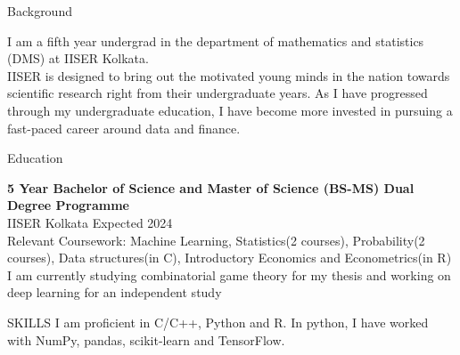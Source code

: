 \documentclass{resume} %
\begin{document}

\begin{rSection}{Background}

I am a fifth year undergrad in the department of mathematics and statistics (DMS) at IISER Kolkata.\\
IISER is designed
to bring out the motivated young minds in the nation towards scientific research right from their undergraduate years.
As I have progressed through my undergraduate education, I have become more invested in pursuing a fast-paced career around data and finance.

\end{rSection}

\begin{rSection}{Education}

{\bf 5 Year Bachelor of Science and Master of Science (BS-MS) Dual Degree Programme}\\ IISER Kolkata \hfill {Expected 2024}\\
Relevant Coursework: Machine Learning, Statistics(2 courses), Probability(2 courses), Data structures(in C), Introductory Economics and Econometrics(in R)\\
I am currently studying combinatorial game theory for my thesis and working on deep learning for an independent study
\end{rSection}



\begin{rSection}{SKILLS}
I am proficient in C/C++, Python and R. In python, I have worked with NumPy, pandas, scikit-learn and TensorFlow.  

\end{rSection}
\end{document}
